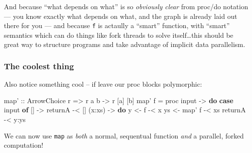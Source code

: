 \documentclass[]{article}
\newenvironment{Shaded}{\begin{snugshade}}{\end{snugshade}}
\newcommand{\DataTypeTok}[1]{\textcolor[rgb]{0.13,0.29,0.53}{#1}}
\newcommand{\DecValTok}[1]{\textcolor[rgb]{0.00,0.00,0.81}{#1}}
\newcommand{\FunctionTok}[1]{\textcolor[rgb]{0.00,0.00,0.00}{#1}}
\newcommand{\KeywordTok}[1]{\textcolor[rgb]{0.13,0.29,0.53}{\textbf{#1}}}
\newcommand{\NormalTok}[1]{#1}
\newcommand{\OtherTok}[1]{\textcolor[rgb]{0.56,0.35,0.01}{#1}}
\begin{document}
And because ``what depends on what'' is so \emph{obviously clear} from proc/do
notation --- you know exactly what depends on what, and the graph is already
laid out there for you --- and because \texttt{f} is actaully a ``smart''
function, with ``smart'' semantics which can do things like fork threads to
solve itself\ldots{}this should be great way to structure programs and take
advantage of implicit data parallelism.

\hypertarget{the-coolest-thing}{%
\subsubsection{The coolest thing}\label{the-coolest-thing}}

Also notice something cool -- if leave our proc blocks polymorphic:

\begin{Shaded}
\begin{Highlighting}[]
\OtherTok{map' ::} \DataTypeTok{ArrowChoice}\NormalTok{ r }\OtherTok{=>}\NormalTok{ r a b }\OtherTok{->}\NormalTok{ r [a] [b]}
\NormalTok{map' f }\FunctionTok{=}\NormalTok{ proc input }\OtherTok{->} \KeywordTok{do}
    \KeywordTok{case}\NormalTok{ input }\KeywordTok{of}
\NormalTok{      []     }\OtherTok{->}
\NormalTok{          returnA        }\FunctionTok{-<}\NormalTok{ []}
\NormalTok{      (x}\FunctionTok{:}\NormalTok{xs) }\OtherTok{->} \KeywordTok{do}
\NormalTok{          y  }\OtherTok{<-}\NormalTok{ f        }\FunctionTok{-<}\NormalTok{ x}
\NormalTok{          ys }\OtherTok{<-}\NormalTok{ map' f   }\FunctionTok{-<}\NormalTok{ xs}
\NormalTok{          returnA        }\FunctionTok{-<}\NormalTok{ y}\FunctionTok{:}\NormalTok{ys}
\end{Highlighting}
\end{Shaded}

We can now use \texttt{map\textquotesingle{}} as \emph{both} a normal,
sequentual function \emph{and} a parallel, forked computation!

\begin{Shaded}
\end{Shaded}
\end{document}
